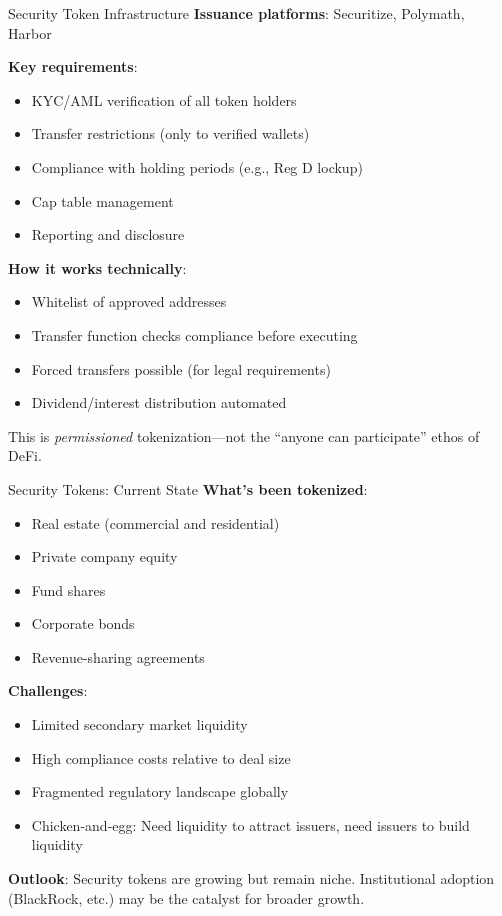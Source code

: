 \documentclass[10pt]{beamer}
\begin{document}
\begin{frame}{Security Token Infrastructure}
  \textbf{Issuance platforms}: Securitize, Polymath, Harbor
  
  \vspace{0.5em}
  \textbf{Key requirements}:
  \begin{itemize}
    \item KYC/AML verification of all token holders
    \item Transfer restrictions (only to verified wallets)
    \item Compliance with holding periods (e.g., Reg D lockup)
    \item Cap table management
    \item Reporting and disclosure
  \end{itemize}
  
  \vspace{1em}
  \textbf{How it works technically}:
  \begin{itemize}
    \item Whitelist of approved addresses
    \item Transfer function checks compliance before executing
    \item Forced transfers possible (for legal requirements)
    \item Dividend/interest distribution automated
  \end{itemize}
  
  \vspace{0.5em}
  This is \textit{permissioned} tokenization---not the ``anyone can participate'' ethos of DeFi.
\end{frame}

\begin{frame}{Security Tokens: Current State}
  \textbf{What's been tokenized}:
  \begin{itemize}
    \item Real estate (commercial and residential)
    \item Private company equity
    \item Fund shares
    \item Corporate bonds
    \item Revenue-sharing agreements
  \end{itemize}
  
  \vspace{0.5em}
  \textbf{Challenges}:
  \begin{itemize}
    \item Limited secondary market liquidity
    \item High compliance costs relative to deal size
    \item Fragmented regulatory landscape globally
    \item Chicken-and-egg: Need liquidity to attract issuers, need issuers to build liquidity
  \end{itemize}
  
  \vspace{1em}
  \textbf{Outlook}: Security tokens are growing but remain niche. Institutional adoption (BlackRock, etc.) may be the catalyst for broader growth.
\end{frame}
\end{document}
